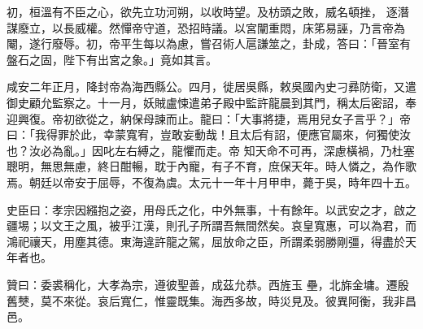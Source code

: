 \begin{pinyinscope}
 初，桓溫有不臣之心，欲先立功河朔，以收時望。及枋頭之敗，威名頓挫，
 逐潛謀廢立，以長威權。然憚帝守道，恐招時議。以宮闡重悶，床笫易誣，乃言帝為閹，遂行廢辱。初，帝平生每以為慮，嘗召術人扈謙筮之，卦成，答曰：「晉室有盤石之固，陛下有出宮之象。」竟如其言。



 咸安二年正月，降封帝為海西縣公。四月，徙居吳縣，敕吳國內史刁彞防衛，又遣御史顧允監察之。十一月，妖賊盧悚遣弟子殿中監許龍晨到其門，稱太后密詔，奉迎興復。帝初欲從之，納保母諫而止。龍曰：「大事將捷，焉用兒女子言乎？」帝曰：「我得罪於此，幸蒙寬宥，豈敢妄動哉！且太后有詔，便應官屬來，何獨使汝也？汝必為亂。」因叱左右縛之，龍懼而走。帝
 知天命不可再，深慮橫禍，乃杜塞聰明，無思無慮，終日酣暢，耽于內寵，有子不育，庶保天年。時人憐之，為作歌焉。朝廷以帝安于屈辱，不復為虞。太元十一年十月甲申，薨于吳，時年四十五。



 史臣曰：孝宗因繦抱之姿，用母氏之化，中外無事，十有餘年。以武安之才，啟之疆埸；以文王之風，被乎江漢，則孔子所謂吾無間然矣。哀皇寬惠，可以為君，而鴻祀禳天，用塵其德。東海違許龍之駕，屈放命之臣，所謂柔弱勝剛彊，得盡於天年者也。



 贊曰：委裘稱化，大孝為宗，遵彼聖善，成茲允恭。西旌玉
 壘，北旆金墉。遷殷舊僰，莫不來從。哀后寬仁，惟靈既集。海西多故，時災見及。彼異阿衡，我非昌邑。



\end{pinyinscope}